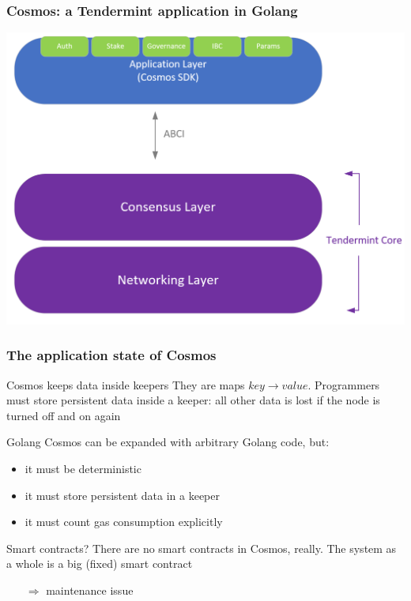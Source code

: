 \documentclass[11pt]{beamer}  %
\begin{document}
\begin{frame}\frametitle{Cosmos: a Tendermint application in Golang}

  \begin{center}
    \includegraphics[scale=0.2,clip=false]{pictures/cosmos.png}
  \end{center}

\end{frame}

\begin{frame}\frametitle{The application state of Cosmos}

  \begin{greenbox}{Cosmos keeps data inside \alert{keepers}}
    They are maps $\mathit{key}\to\mathit{value}$. Programmers must store
    persistent data inside a keeper: all other data is lost if the node
    is turned off and on again
  \end{greenbox}

  \bigskip

  \begin{greenbox}{Golang}
    Cosmos can be expanded with arbitrary Golang code, but:
    \begin{itemize}
    \item it must be deterministic
    \item it must store persistent data in a keeper
    \item it must count gas consumption explicitly
    \end{itemize}
  \end{greenbox}

  \bigskip

  \begin{greenbox}{Smart contracts?}
    There are no smart contracts in Cosmos, really. The system as a whole
    is a big (fixed) smart contract
    \begin{itemize}
    \item[$\Rightarrow$] maintenance issue
    \end{itemize}
  \end{greenbox}

\end{frame}
\end{document}
